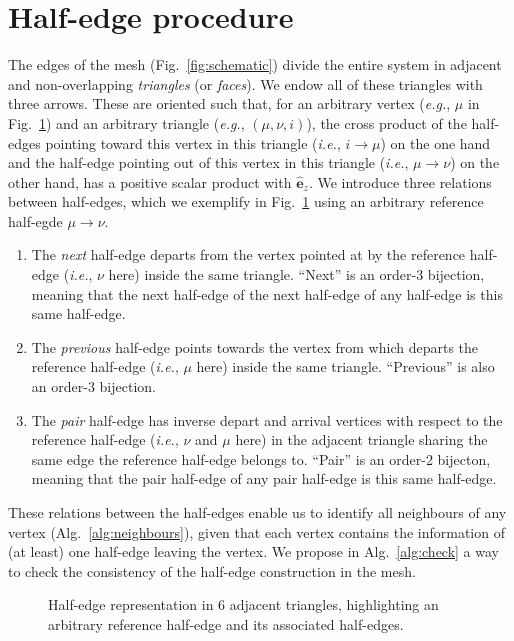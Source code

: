 \documentclass[aps, superscriptaddress, notitlepage]{revtex4-1}
\def\scale{0.8}
\begin{document}
\section{Half-edge procedure}

The edges of the mesh (Fig.~\ref{fig:schematic}) divide the entire system in adjacent and non-overlapping \textit{triangles} (or \textit{faces}). We endow all of these triangles with three arrows. These are oriented such that, for an arbitrary vertex (\textit{e.g.}, $\mu$ in Fig.~\ref{fig:he}) and an arbitrary triangle (\textit{e.g.}, $(\mu, \nu, i)$), the cross product of the half-edges pointing toward this vertex in this triangle (\textit{i.e.}, $i \to \mu$) on the one hand and the half-edge pointing out of this vertex in this triangle (\textit{i.e.}, $\mu \to \nu$) on the other hand, has a positive scalar product with $\hat{\boldsymbol{e}}_z$. We introduce three relations between half-edges, which we exemplify in Fig.~\ref{fig:he} using an arbitrary {\color{yellow} reference half-egde $\mu \to \nu$}.
\begin{enumerate}
    \item The {\color{purple} \textit{next} half-edge} departs from the vertex pointed at by the reference half-edge (\textit{i.e.}, $\nu$ here) inside the same triangle. ``Next'' is an order-3 bijection, meaning that the next half-edge of the next half-edge of any half-edge is this same half-edge.
    \item The {\color{green} \textit{previous} half-edge} points towards the vertex from which departs the reference half-edge (\textit{i.e.}, $\mu$ here) inside the same triangle. ``Previous'' is also an order-3 bijection.
    \item The {\color{blue} \textit{pair} half-edge} has inverse depart and arrival vertices with respect to the reference half-edge (\textit{i.e.}, $\nu$ and $\mu$ here) in the adjacent triangle sharing the same edge the reference half-edge belongs to. ``Pair'' is an order-2 bijecton, meaning that the pair half-edge of any pair half-edge is this same half-edge.
\end{enumerate}
These relations between the half-edges enable us to identify all neighbours of any vertex (Alg.~\ref{alg:neighbours}), given that each vertex contains the information of (at least) one half-edge leaving the vertex. We propose in Alg.~\ref{alg:check} a way to check the consistency of the half-edge construction in the mesh.

\begin{figure}[!t]
\centering
\begin{tikzpicture}[scale=0.8*\scale]

\end{tikzpicture}
\caption{Half-edge representation in 6 adjacent triangles, highlighting an arbitrary reference half-edge and its associated half-edges.}
\label{fig:he}
\end{figure}
\end{document}
